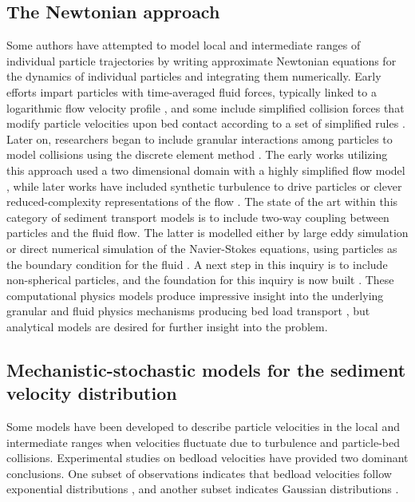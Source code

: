 \subsection{The Newtonian approach}

Some authors have attempted to model local and intermediate ranges of individual particle trajectories by writing approximate Newtonian equations for the dynamics of individual particles and integrating them numerically. Early efforts impart particles with time-averaged fluid forces, typically linked to a logarithmic flow velocity profile \citep{VanRijn1984}, and some include simplified collision forces that modify particle velocities upon bed contact according to a set of simplified rules \citep{Wiberg1985,Sekine1992}.
Later on, researchers began to include granular interactions among particles to model collisions using the discrete element method \citep{Cundall1979, Haff1993}.
The early works utilizing this approach used a two dimensional domain with a highly simplified flow model \citep{Jiang1993}, while later works have included synthetic turbulence to drive particles \citep{McEwan2001,Schmeeckle2003,Maurin2015} or clever reduced-complexity representations of the flow \citep{Clark2015,Clark2017}.
The state of the art within this category of sediment transport models is to include two-way coupling between particles and the fluid flow. The latter is modelled either by large eddy simulation or direct numerical simulation of the Navier-Stokes equations, using particles as the boundary condition for the fluid \citep{Schmeeckle2014,Ji2013,Gonzalez2017,Vowincklel2014,Elghannay2017,Yousefi2020}.
A next step in this inquiry is to include non-spherical particles, and the foundation for this inquiry is now built \citep{Wachs2011, Azema2012, Wachs2019}.
These computational physics models produce impressive insight into the underlying granular and fluid physics mechanisms producing bed load transport \citep{Frey2011}, but analytical models are desired for further insight into the problem.

\subsection{Mechanistic-stochastic models for the sediment velocity distribution}
\label{sec:langevin}

Some models have been developed to describe particle velocities in the local and intermediate ranges when velocities fluctuate due to turbulence and particle-bed collisions.
Experimental studies on bedload velocities have provided two dominant conclusions. One subset of observations indicates that bedload velocities follow exponential distributions \citep{Lajeunesse2010,Furbish2012,Fathel2015}, and another subset indicates Gaussian distributions \citep{Martin2012,Ancey2014,Heyman2016}.


